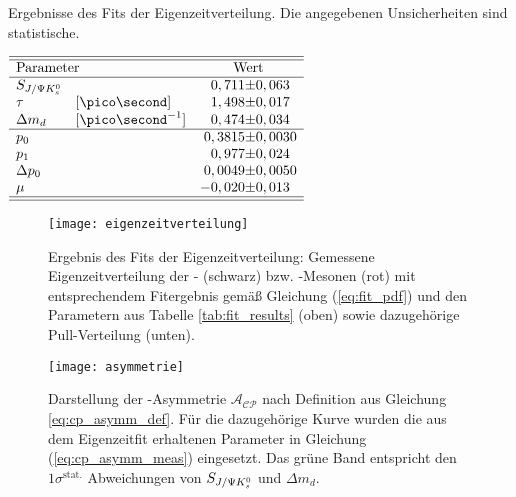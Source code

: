 \begin{table}[hptb]
\centering
\caption{Ergebnisse des Fits der Eigenzeitverteilung. Die angegebenen Unsicherheiten sind statistische.}
\label{tab:fit_results}
$\begin{array}{ll r@{\pm}l}
\hline 
\hline
\multicolumn{2}{l}{\text{Parameter}} & \multicolumn{2}{c}{\text{Wert}}\\
\hline
\SJPsi & & 0,711 & 0,063 \\
\tau & [\ps] & 1,498 & 0,017 \\
\Delta m_d & [\ps^{-1}] & 0,474 & 0,034 \\ \hline
p_0 & & 0,3815 & 0,0030\\
p_1 & & 0,977 & 0,024 \\
\Delta p_0 & & 0,0049 & 0,0050 \\
\mu & & -0,020 & 0,013 \\ \hline \hline
\end{array}$ 
\end{table}
\begin{figure}[hptb]
\centering
\texttt{[image: eigenzeitverteilung]}
\caption{Ergebnis des Fits der Eigenzeitverteilung: Gemessene Eigenzeitverteilung der \Bd- (schwarz) bzw. \Bdbar-Mesonen (rot) mit entsprechendem Fitergebnis gemäß Gleichung (\ref{eq:fit_pdf}) und den Parametern aus Tabelle \ref{tab:fit_results} (oben) sowie dazugehörige Pull-Verteilung (unten).}
\label{fig:fit_result}
\end{figure}
\begin{figure}[hptb]
\centering
\texttt{[image: asymmetrie]}
\caption{Darstellung der \CP-Asymmetrie $\mathcal{A_{CP}}$ nach Definition aus Gleichung \ref{eq:cp_asymm_def}. Für die dazugehörige Kurve wurden die aus dem Eigenzeitfit erhaltenen Parameter in Gleichung (\ref{eq:cp_asymm_meas}) eingesetzt. Das grüne Band entspricht den $1\sigma^{\text{stat.}}$ Abweichungen von $S_{J/\Psi K_s^0}$ und $\Delta m_d$.}
\label{fig:asymmetrie}
\end{figure}